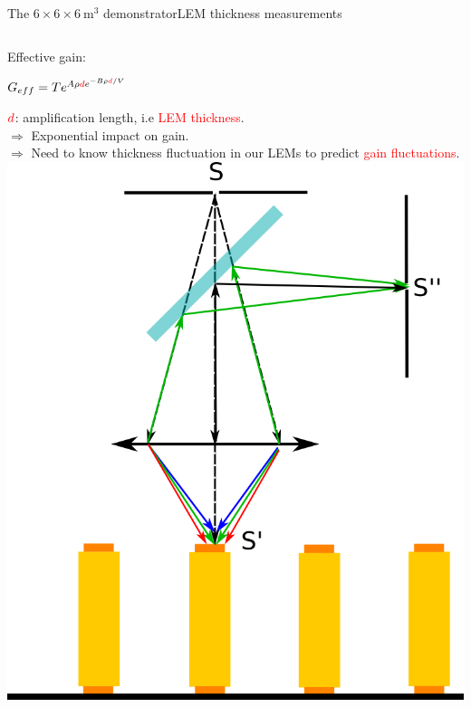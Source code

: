 \documentclass[10pt]{beamer}
\begin{document}
    \begin{frame}{The \texorpdfstring{$6 \times 6 \times \SI{6}{\meter\cubed}$}{666} demonstrator}{LEM thickness measurements}
    	\begin{scriptsize}
    		\begin{columns}
    			\begin{column}{0.48\textwidth}
    				Effective gain:\\
    				\begin{center}
	    				$G _{eff}= Te^{A\rho \textcolor{red}{d} e^{-B\rho \textcolor{red}{d}/V}}$\\
    				\end{center}
    				$\textcolor{red}{d}$: amplification length, i.e \textcolor{red}{LEM thickness}.\\
    				$\Rightarrow$ Exponential impact on gain.\\
    				$\Rightarrow$ Need to know thickness fluctuation in our LEMs to predict \textcolor{red}{gain fluctuations}.\\
    				\vfill
    				\centering \includegraphics[height=0.5\textheight]{figures/666/CCI.png}\\\vfill

\end{column}
\end{columns}
\end{scriptsize}
\end{frame}
\end{document}
